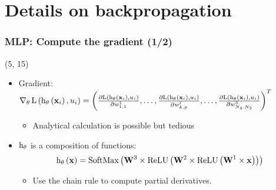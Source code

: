 \section{Details on backpropagation}

\begin{frame}[label=Backpropagation]
  \frametitle{\acl{MLP}: Compute the gradient (1/2)}

  \begin{textblock}{90}(5, 15)
    \begin{itemize}
    \item Gradient:
      $
      \operatorname{\nabla}_{\mathbf{\theta}} \mathrm{L} \left ( {\mathrm{h}_{\mathbf{\theta}} \left ( {\mathbf{x}_i} \right ), u_i} \right ) =
      \left( \frac{\partial \mathrm{L} \left ( {\mathrm{h}_{\mathbf{\theta}} \left ( {\mathbf{x}_i} \right ),
            u_i} \right )}{\partial w_{1,1}^1}, \ldots, \frac{\partial \mathrm{L} \left ( {\mathrm{h}_{\mathbf{\theta}} \left ( {\mathbf{x}_i} \right ), u_i} \right )}{\partial w_{k,p}^{\ell}},\ldots,\frac{\partial \mathrm{L} \left ( {\mathrm{h}_{\mathbf{\theta}} \left ( {\mathbf{x}_i} \right ), u_i} \right )}{\partial w_{N_{4},N_{3}}^{3}} \right)^T
      $

      \begin{itemize}
      \item Analytical calculation is possible but tedious
      \end{itemize}
    \item $\mathrm{h}_{\mathbf{\theta}}$ is a composition of functions:
      \[
        \apply{\hyp_{\params}}{\example} = \apply{\softMaxFunc}{%
          \weightMatrix^3 \times
          \apply{\ReLUFunc}{%
            \weightMatrix^2 \times
            \apply{\ReLUFunc}{%
              \weightMatrix^1 \times \example
            }
          }
        }
      \]
      \begin{itemize}
      \item Use the chain rule to compute partial derivatives.
      \end{itemize}
    \end{itemize}
  \end{textblock}
\end{frame}

